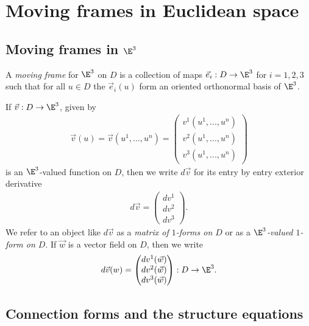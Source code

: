 \documentclass{article}
\begin{document}
\section{Moving frames in Euclidean space}

\subsection{Moving frames in $\E^3$}

\begin{definition}
    A \emph{moving frame} for $\E^3$ on $D$ is a collection of maps $\vec e_i:D\to\E^3$
    for $i=1,2,3$ such that for all $u\in D$ the $\vec e_i(u)$ form an oriented orthonormal
    basis of $\E^3$.
\end{definition}

\begin{definition}
    If $\vec v:D\to\E^3$, given by 
    \begin{align*}
        \vec v(u)=\vec v(u^1,...,u^n)=\begin{pmatrix}
            v^1(u^1,...,u^n)\\ 
            v^2(u^1,...,u^n)\\
            v^3(u^1,...,u^n)
        \end{pmatrix}
    \end{align*}
    is an $\E^3$-valued function on $D$, then we write $d\vec v$ for its entry
    by entry exterior derivative 
    \begin{align*}
        d\vec v = \begin{pmatrix}
            dv^1 \\ dv^2 \\ dv^3
        \end{pmatrix}.
    \end{align*}
    We refer to an object like $d\vec v$ as a \emph{matrix of $1$-forms on $D$} or as a 
    \emph{$\E^3$-valued $1$-form on $D$}. If $\vec w$ is a vector field on $D$, then we write
    \begin{align*}
        d\vec v(w) = \begin{pmatrix}
            dv^1(\vec w) \\ dv^2(\vec w) \\ dv^3(\vec w)
        \end{pmatrix} : D\to\E^3.
    \end{align*}
\end{definition}

\subsection{Connection forms and the structure equations}
\end{document}
